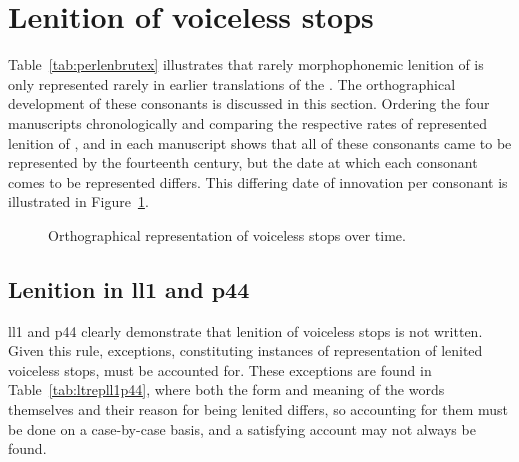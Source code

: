 \section{Lenition of voiceless stops}
\label{sec:lenit-voic-stops}

Table~\ref{tab:perlenbrutex} illustrates that  rarely morphophonemic lenition of  is only represented rarely in  earlier translations of the . The orthographical development of these consonants is discussed in this section. Ordering the four manuscripts  chronologically and comparing the respective rates of represented lenition of , and  in each manuscript shows that all of these consonants came to be represented by the fourteenth century, but the date at which each consonant comes to be represented differs. This differing date of innovation per consonant is illustrated in Figure~\ref{fig:linechartbrut}.  

\begin{figure}[h]
  \centering
  \caption{Orthographical representation of voiceless stops over time.}
  \label{fig:linechartbrut}
\end{figure}

\subsection{Lenition in \acrshort{ll1} and \acrshort{p44}}
\label{sec:lenit-acrsh-acrsh}
\Gls{ll1} and \gls{p44} clearly demonstrate that lenition of voiceless stops is not written.
Given this rule, exceptions, constituting instances of representation of lenited voiceless stops, must be accounted for.
These exceptions are found in Table~\ref{tab:ltrepll1p44}, where both the form and meaning of the words themselves and their reason for being lenited differs, so accounting for them must be done on a case-by-case basis, and a satisfying account may not always be found.

